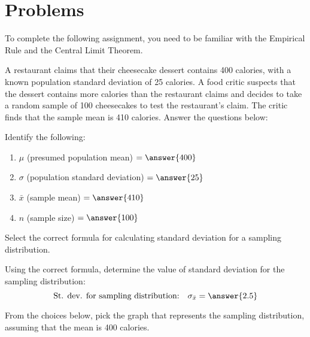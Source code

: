\documentclass{ximera}
\begin{document}
\section{Problems}
To complete the following assignment, you need to be familiar with the Empirical Rule and the Central Limit Theorem.
\begin{problem}\label{pr:cheesecake}
A restaurant claims that their cheesecake dessert contains 400 calories, with a known population standard deviation of 25 calories. A food critic suspects that the dessert contains more calories than the restaurant claims and decides to take a random sample of 100 cheesecakes to test the restaurant's claim. The critic finds that the sample mean is 410 calories. Answer the questions below:

\begin{question} 
Identify the following:
\begin{enumerate}
    \item $\mu$ (presumed population mean) $= \answer{400}$
    \item $\sigma$ (population standard deviation) $= \answer{25}$
    \item $\bar{x}$ (sample mean) $=\answer{410}$
    \item $n$ (sample size) $= \answer{100}$
\end{enumerate}
\end{question}

\begin{question} Select the correct formula for calculating standard deviation for a sampling distribution.

\begin{multipleChoice}  
\end{multipleChoice} 

\end{question}

\begin{question} Using the correct formula, determine the value of standard deviation for the sampling distribution:
$$\mbox{St. dev. for sampling distribution:}\quad\sigma_{\bar{x}}= \answer{2.5}$$
\end{question}

\begin{question} From the choices below, pick the graph that represents the sampling distribution, assuming that the mean is 400 calories. %


\end{question}
\end{problem}
\end{document}

